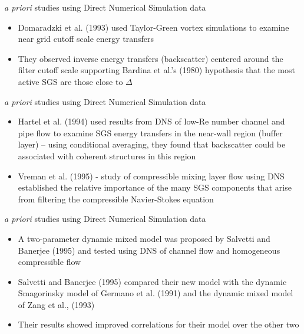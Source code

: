 \begin{frame}{\textit{a priori} studies using Direct Numerical Simulation data}
\begin{itemize}
	\item Domaradzki et al. (1993) used Taylor-Green vortex simulations to examine near grid cutoff scale energy transfers
	\item They observed inverse energy transfers (backscatter) centered around the filter cutoff scale supporting Bardina et al.'s (1980) hypothesis that the most active SGS are those close to $\Delta$
\end{itemize}
\end{frame}


\begin{frame}{\textit{a priori} studies using Direct Numerical Simulation data}
\begin{itemize}
	\item Hartel et al. (1994) used results from DNS of low-Re number channel and pipe flow to examine SGS energy transfers in the near-wall region (buffer layer) -- using conditional averaging, they found that backscatter could be associated with coherent structures in this region 
	\item Vreman et al. (1995) - study of compressible mixing layer flow using DNS established the relative importance of the many SGS components that arise from filtering the compressible Navier-Stokes equation 
\end{itemize}
\end{frame}


\begin{frame}{\textit{a priori} studies using Direct Numerical Simulation data}
\begin{itemize}
	\item A two-parameter dynamic mixed model was proposed by Salvetti and Banerjee (1995) and tested using DNS of channel flow and homogeneous compressible flow
	\item Salvetti and Banerjee (1995) compared their new model with the dynamic Smagorinsky model of Germano et al. (1991) and the dynamic mixed model of Zang et al., (1993)
	\item Their results showed improved correlations for their model over the other two
\end{itemize}
\end{frame}

